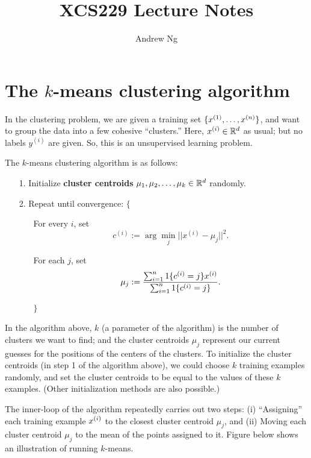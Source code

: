 \documentclass{article}
\begin{document}
\title{XCS229 Lecture Notes}
\author{Andrew Ng}
\date{}
\maketitle




\section*{The $k$-means clustering algorithm} 

In the clustering problem, we are given a training set $\{x^{(1)}, \ldots, x^{({n})}\}$,
and want to group the data into a few cohesive ``clusters.''  
Here, $x^{(i)} \in {\mathbb R}^{d}$ as usual; but 
no labels $y^{(i)}$ are given. So, this is an unsupervised learning problem.

The $k$-means clustering algorithm is as follows:
\begin{itemize}
\item[1.] Initialize {\bf cluster centroids} $\mu_1, \mu_2, \ldots, \mu_k \in {\mathbb R}^{d}$ randomly.
\item[2.] Repeat until convergence: $\{$
\begin{itemize}
\item[] For every $i$, set 
\[
c^{(i)} := \arg \min_j ||x^{(i)} - \mu_j||^2.
\]
\item[] For each $j$, set 
\[
\mu_j := \frac{\sum_{i=1}^{n} 1\{c^{(i)}=j\} x^{(i)}}{\sum_{i=1}^{n} 1\{c^{(i)}=j\}}. 
\]
\item[] $\}$
\end{itemize}
\end{itemize}

In the algorithm above, $k$ (a parameter of the algorithm) is the number of
clusters we want to find; and the cluster centroids $\mu_j$ represent our
current guesses for the positions of the centers of the clusters.  To initialize the
cluster centroids (in step 1 of the algorithm above), we could choose $k$ training 
examples randomly, and set the cluster centroids to be equal to the values of 
these $k$ examples.  (Other initialization methods are also possible.) 

The inner-loop of the algorithm repeatedly carries out two steps: (i)
``Assigning'' each training example ${x^{(i)}}$ to the closest cluster centroid
$\mu_j$, and (ii) Moving each cluster centroid $\mu_j$ to the mean of the
points assigned to it.  Figure below shows an illustration of
running $k$-means.
\end{document}
